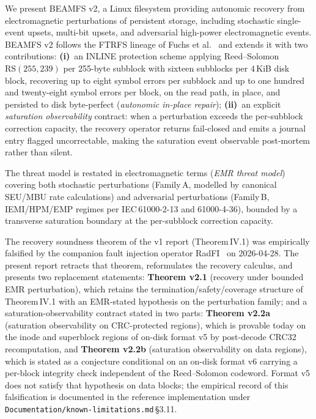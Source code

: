 We present BEAMFS v2, a Linux filesystem providing autonomic
recovery from electromagnetic perturbations of persistent storage,
including stochastic single-event upsets, multi-bit upsets, and
adversarial high-power electromagnetic events. BEAMFS v2 follows
the FTRFS lineage of Fuchs et al.~\cite{fuchs2015ftrfs} and
extends it with two contributions:
\textbf{(i)}~an INLINE protection scheme applying Reed--Solomon
\(\mathrm{RS}(255,239)\) per 255-byte subblock with sixteen
subblocks per 4\,KiB disk block, recovering up to eight symbol
errors per subblock and up to one hundred and twenty-eight symbol
errors per block, on the read path, in place, and persisted to
disk byte-perfect (\emph{autonomic in-place repair});
\textbf{(ii)}~an explicit \emph{saturation observability} contract:
when a perturbation exceeds the per-subblock correction capacity,
the recovery operator returns fail-closed and emits a journal entry
flagged uncorrectable, making the saturation event observable
post-mortem rather than silent.

The threat model is restated in electromagnetic terms (\emph{EMR
threat model}) covering both stochastic perturbations
(Family\,A, modelled by canonical SEU/MBU rate calculations) and
adversarial perturbations (Family\,B, IEMI/HPM/EMP regimes per
IEC\,61000-2-13 and 61000-4-36), bounded by a transverse saturation
boundary at the per-subblock correction capacity.

The recovery soundness theorem of the v1 report (Theorem\,IV.1)
was empirically falsified by the companion fault injection
operator RadFI~\cite{desbrieres2026radfi} on 2026-04-28. The
present report retracts that theorem, reformulates the recovery
calculus, and presents two replacement statements:
\textbf{Theorem v2.1} (recovery under bounded EMR perturbation),
which retains the termination/safety/coverage structure of
Theorem\,IV.1 with an EMR-stated hypothesis on the perturbation
family; and a saturation-observability contract stated in two
parts: \textbf{Theorem v2.2a} (saturation observability on
CRC-protected regions), which is provable today on the inode and
superblock regions of on-disk format v5 by post-decode CRC32
recomputation, and \textbf{Theorem v2.2b} (saturation observability
on data regions), which is stated as a conjecture conditional on an
on-disk format v6 carrying a per-block integrity check independent
of the Reed--Solomon codeword. Format v5 does not satisfy that
hypothesis on data blocks; the empirical record of this falsification
is documented in the reference implementation under
\texttt{Documentation/known-limitations.md}\,\S3.11.

